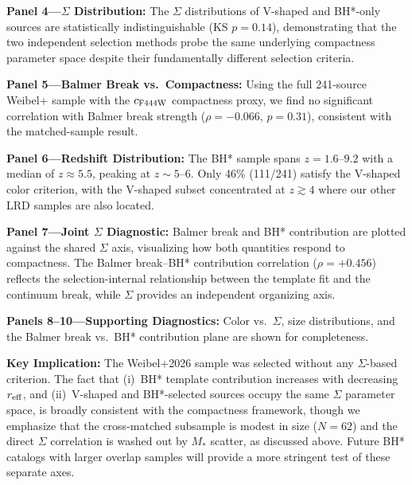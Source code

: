 \documentclass[twocolumn,linenumbers]{aastex631}
\begin{document}
\textbf{Panel 4---$\Sigma$ Distribution:} The $\Sigma$ distributions of V-shaped and BH*-only sources are statistically indistinguishable (KS $p = 0.14$), demonstrating that the two independent selection methods probe the same underlying compactness parameter space despite their fundamentally different selection criteria.

\textbf{Panel 5---Balmer Break vs.\ Compactness:} Using the full 241-source Weibel+ sample with the $c_{\rm F444W}$ compactness proxy, we find no significant correlation with Balmer break strength ($\rho = -0.066$, $p = 0.31$), consistent with the matched-sample result.

\textbf{Panel 6---Redshift Distribution:} The BH* sample spans $z=1.6$--$9.2$ with a median of $z \approx 5.5$, peaking at $z \sim 5$--$6$. Only 46\% (111/241) satisfy the V-shaped color criterion, with the V-shaped subset concentrated at $z \gtrsim 4$ where our other LRD samples are also located.

\textbf{Panel 7---Joint $\Sigma$ Diagnostic:} Balmer break and BH* contribution are plotted against the shared $\Sigma$ axis, visualizing how both quantities respond to compactness. The Balmer break--BH* contribution correlation ($\rho = +0.456$) reflects the selection-internal relationship between the template fit and the continuum break, while $\Sigma$ provides an independent organizing axis.

\textbf{Panels 8--10---Supporting Diagnostics:} Color vs.\ $\Sigma$, size distributions, and the Balmer break vs.\ BH* contribution plane are shown for completeness.

\textbf{Key Implication:} The Weibel+2026 sample was selected without any $\Sigma$-based criterion. The fact that (i)~BH* template contribution increases with decreasing $r_{\rm eff}$, and (ii)~V-shaped and BH*-selected sources occupy the same $\Sigma$ parameter space, is broadly consistent with the compactness framework, though we emphasize that the cross-matched subsample is modest in size ($N=62$) and the direct $\Sigma$ correlation is washed out by $M_*$ scatter, as discussed above. Future BH* catalogs with larger overlap samples will provide a more stringent test of these separate axes.
\end{document}
